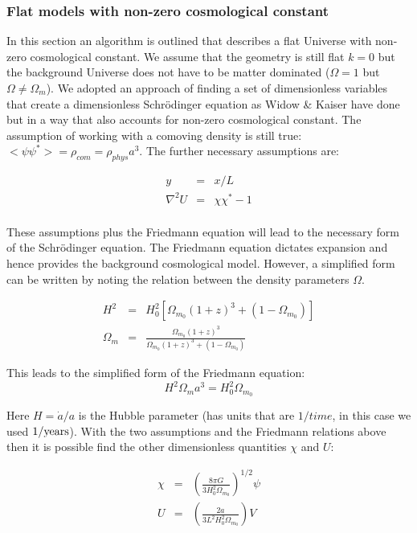 \subsubsection{Flat models with non-zero cosmological constant}
\label{gen_exp}
In this section an algorithm is outlined that describes a flat Universe with non-zero cosmological constant. We assume that the geometry is still flat $k=0$ but the background Universe does not have to be matter dominated ($\Omega =1$ but $\Omega \ne \Omega_m$). We adopted an approach of finding a set of dimensionless variables that create a dimensionless Schr\"odinger equation as Widow \& Kaiser have done but in a way that also accounts for non-zero cosmological constant. The assumption of working with a comoving density is still true: $<\psi \psi^*>= \rho_{com} = \rho_{phys} a^3 $. The further necessary assumptions are:

\begin{eqnarray}
y &=& x/L \nonumber \\
\nabla^2 U &=& \chi \chi^* - 1 \\
\end{eqnarray}

\noindent These assumptions plus the Friedmann equation will lead to the necessary form of the Schr\"odinger equation. The Friedmann equation dictates expansion and hence provides the background cosmological model. However, a simplified form can be written by noting the relation between the density parameters $\Omega$.

\begin{eqnarray}
H^2 &=& H_0^2 [\Omega_{m_0} (1 + z)^3 + (1 - \Omega_{m_0})] \nonumber \\
\Omega_m &=& \frac{\Omega_{m_0}(1 + z)^3}{\Omega_{m_0} (1 + z)^3 + (1 - \Omega_{m_0})}
\end{eqnarray}

\noindent This leads to the simplified form of the Friedmann equation:
\begin{equation}
H^2 \Omega_m a^3 = H_0^2 \Omega_{m_0}
\end{equation}

\noindent Here $H = \dot{a}/a$ is the Hubble parameter (has units that are $1/time$, in this case we used $1/ {\rm years}$). With the two assumptions and the Friedmann relations above then it is possible find the other dimensionless quantities $\chi$ and $U$:

\begin{eqnarray}
\chi &=& \left(\frac{8\pi G}{3 H_0^2 \Omega_{m_0}}\right)^{1/2} \psi \nonumber \\
U &=& \left(\frac{2 a}{3 L^2 H_0^2 \Omega_{m_0}}\right) V
\end{eqnarray}

